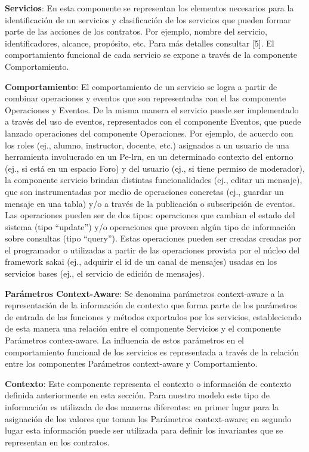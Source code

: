 \textbf{Servicios}: En esta componente se representan los elementos necesarios
para la identificación de un servicios y clasificación de los servicios que
pueden formar parte de las acciones de los contratos. Por ejemplo, nombre del
servicio, identificadores, alcance, propósito, etc. Para más detalles
consultar [5]. El comportamiento funcional de cada servicio se expone a través
de la componente Comportamiento.


\textbf{Comportamiento}: El comportamiento de un servicio se logra a partir de
combinar operaciones y eventos que son representadas con el las componente
Operaciones y Eventos. De la misma manera el servicio puede ser implementado a
través del uso de eventos, representados con  el componente Eventos, que puede
lanzado operaciones del componente Operaciones. Por ejemplo, de acuerdo con los
roles (ej., alumno, instructor, docente, etc.) asignados a un usuario de una
herramienta involucrado en un Pe-lrn, en un determinado contexto del entorno
(ej., si está en un espacio Foro) y del usuario (ej., si tiene permiso de
moderador), la componente servicio brindan distintas funcionalidades (ej.,
editar un mensaje), que son instrumentadas por medio de operaciones concretas
(ej., guardar un mensaje en una tabla) y/o a través de la publicación o
subscripción de eventos. Las operaciones pueden ser de dos tipos: operaciones
que cambian el estado del sistema (tipo “update”) y/o operaciones que proveen
algún tipo de información sobre consultas (tipo “query”). Estas operaciones
pueden ser creadas creadas por el programador o utilizadas a partir de las
operaciones provista por el núcleo del framework sakai (ej., adquirir el id de
un canal de mensajes) usadas en los servicios bases (ej., el servicio de
edición de mensajes).


\textbf{Parámetros Context-Aware}: Se denomina parámetros context-aware a la
representación de la información de contexto que forma parte de los
parámetros de entrada de las funciones y métodos exportados por los servicios,
estableciendo de esta manera una relación entre el componente Servicios y el
componente Parámetros contex-aware. La influencia de estos parámetros en el
comportamiento funcional de los servicios es representada a través de
la relación entre los componentes Parámetros context-aware y Comportamiento.


\textbf{Contexto}: Este componente representa el contexto o información de
contexto definida anteriormente en esta sección. Para nuestro modelo este tipo
de información es utilizada de dos maneras diferentes: en primer lugar para la
asignación de los valores que toman los Parámetros context-aware; en segundo
lugar esta información puede ser utilizada para definir los invariantes que se
representan en los contratos.


